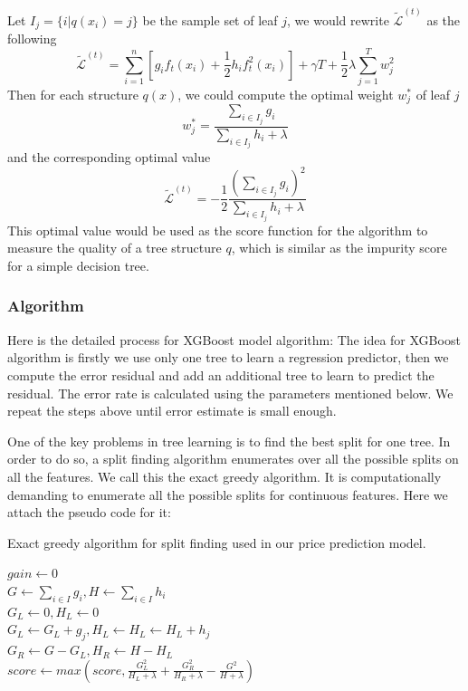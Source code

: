 \documentclass[letterpaper]{article}
\begin{document}
Let $I_j = \{i| q(x_i) = j\}$ be the sample set of leaf $j$, we would rewrite $\tilde{\mathcal{L}}^{(t)}$ as the following
$$
\tilde{\mathcal{L}}^{(t)} = \sum_{i = 1}^n[g_if_t(x_i) + \frac{1}{2}h_if_t^2(x_i)] + \gamma T + \frac{1}{2}\lambda\sum_{j = 1}^Tw_j^2
$$
Then for each structure $q(x)$, we could compute the optimal weight $w_j^{*}$ of leaf $j$
$$
w_j^{*} = \frac{ \sum_{i \in I_j}g_i}{ \sum_{i \in I_j}h_i + \lambda}
$$
and the corresponding optimal value
$$
\tilde{\mathcal{L}}^{(t)}  = -\frac{1}{2}\frac{(\sum_{i \in I_j}g_i)^2}{\sum_{i \in I_j}h_i + \lambda}
$$
This optimal value would be used as the score function for the algorithm to measure the quality of a tree structure $q$, which is similar as the impurity score for a simple decision tree.


\subsubsection{Algorithm}
Here is the detailed process for XGBoost model algorithm:
The idea for XGBoost algorithm is firstly we use only one tree to learn a regression predictor, then we compute the error residual and add an additional tree to learn to predict the residual. The error rate is calculated using the parameters mentioned below. We repeat the steps above until error estimate is small enough.

One of the key problems in tree learning is to find the best split for one tree. In order to do so, a split finding algorithm enumerates over all the possible splits on all the features. We call this the exact greedy algorithm. It is computationally demanding to enumerate all the possible splits for continuous features. Here we attach the pseudo code for it:

\begin{algorithm}[H]
            \caption{Exact greedy algorithm for split finding used in our price prediction model.}
            
            $gain \gets 0$\\
            $G \gets \sum_{i \in I} g_i, H \gets \sum_{i \in I} h_i$\\ 
            { 
            $G_L \gets 0, H_L \gets 0$\\
                { 
                    $G_L \gets G_L + g_j, H_L \gets H_L \gets H_L + h_j$\\
                    $G_R \gets G - G_L, H_R \gets H - H_L$\\
                    $score \gets max(score, \frac{G_L^2}{H_L + \lambda} + \frac{G_R^2}{H_R + \lambda} - \frac{G^2}{H + \lambda})$
                }  
            } 
            
\end{algorithm}
\end{document}
